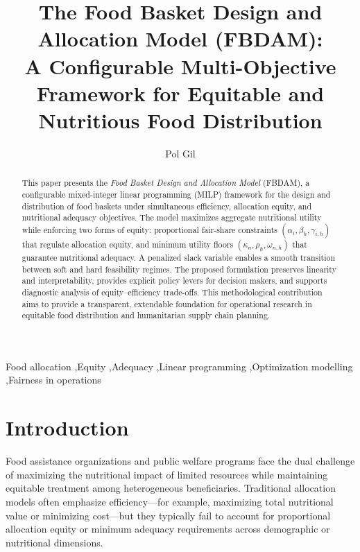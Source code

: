\documentclass[preprint,12pt]{elsarticle}
\begin{document}
\begin{frontmatter}

\title{The Food Basket Design and Allocation Model (FBDAM):\\
A Configurable Multi-Objective Framework for Equitable and Nutritious Food Distribution}

\author{Pol Gil}
\address{Zero Hunger Lab, Tilburg University, The Netherlands\\
\texttt{pol.gil@tilburguniversity.edu}}

\begin{abstract}
This paper presents the \emph{Food Basket Design and Allocation Model} (FBDAM), a configurable mixed-integer linear programming (MILP) framework for the design and distribution of food baskets under simultaneous efficiency, allocation equity, and nutritional adequacy objectives. The model maximizes aggregate nutritional utility while enforcing two forms of equity: proportional fair-share constraints $(\alpha_i, \beta_h, \gamma_{i,h})$ that regulate allocation equity, and minimum utility floors $(\kappa_n, \rho_h, \omega_{n,h})$ that guarantee nutritional adequacy. A penalized slack variable enables a smooth transition between soft and hard feasibility regimes. The proposed formulation preserves linearity and interpretability, provides explicit policy levers for decision makers, and supports diagnostic analysis of equity--efficiency trade-offs. This methodological contribution aims to provide a transparent, extendable foundation for operational research in equitable food distribution and humanitarian supply chain planning.
\end{abstract}

\begin{keyword}
Food allocation \sep Equity \sep Adequacy \sep Linear programming \sep Optimization modelling \sep Fairness in operations
\end{keyword}

\end{frontmatter}

\section{Introduction}
Food assistance organizations and public welfare programs face the dual challenge of maximizing the nutritional impact of limited resources while maintaining equitable treatment among heterogeneous beneficiaries. Traditional allocation models often emphasize efficiency---for example, maximizing total nutritional value or minimizing cost---but they typically fail to account for proportional allocation equity or minimum adequacy requirements across demographic or nutritional dimensions.
\end{document}
